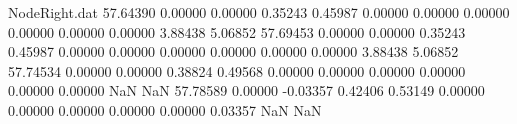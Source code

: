 \begin{filecontents}{NodeRight.dat}
  57.64390    0.00000    0.00000     0.35243    0.45987    0.00000    0.00000    0.00000    0.00000    0.00000    0.00000    3.88438    5.06852
  57.69453    0.00000    0.00000     0.35243    0.45987    0.00000    0.00000    0.00000    0.00000    0.00000    0.00000    3.88438    5.06852
  57.74534    0.00000    0.00000     0.38824    0.49568    0.00000    0.00000    0.00000    0.00000    0.00000    0.00000        NaN        NaN
  57.78589    0.00000   -0.03357     0.42406    0.53149    0.00000    0.00000    0.00000    0.00000    0.00000    0.03357        NaN        NaN
\end{filecontents}

